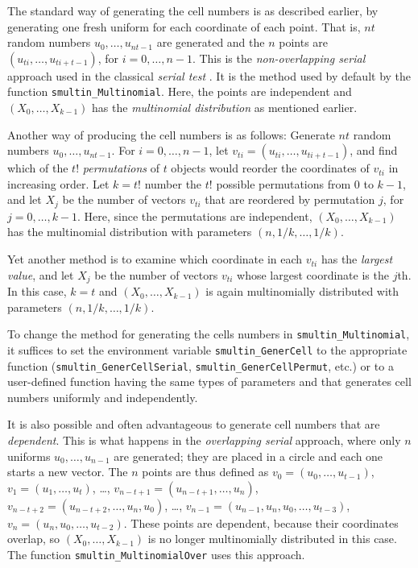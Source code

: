 The 
 standard way of generating the cell numbers is as described earlier,
by generating one fresh uniform for each coordinate of each point.
That is, $nt$ random numbers $u_0,\dots,u_{nt-1}$ are generated and
the $n$ points are $(u_{ti},\dots,u_{ti+t-1})$, for $i=0,\dots,n-1$.
This is the {\em non-overlapping serial\/} approach used in the
classical {\em serial test\/} \cite{rKNU98a}.
It is the method used by default by the function 
{\tt smultin\_Multinomial}.
Here, the points are independent and $(X_0,\dots,X_{k-1})$ has the 
{\em multinomial distribution\/} as mentioned earlier.

Another way of producing the cell numbers is as follows:
Generate $nt$ random numbers $u_0,\dots,u_{nt-1}$.
For $i=0,\dots,n-1$, let $v_{ti} = (u_{ti},\dots,u_{ti+t-1})$, 
and find which of the $t!$ {\em permutations\/} of $t$ objects would
reorder the coordinates of $v_{ti}$ in increasing order.
Let $k = t!$ number the $t!$ possible permutations from 0 to $k-1$, 
and let $X_j$ be the number of vectors $v_{ti}$ that are reordered 
by permutation $j$, for $j = 0,\dots,k-1$.
Here, since the permutations are independent, $(X_0,\dots,X_{k-1})$ 
has the multinomial distribution with parameters $(n,1/k,\dots,1/k)$.

Yet another method is to examine which coordinate in each $v_{ti}$ has
the {\em largest value\/}, and let $X_j$ be the number of vectors $v_{ti}$
whose largest coordinate is the $j$th.
In this case, $k=t$ and  $(X_0,\dots,X_{k-1})$ is again 
multinomially distributed with parameters $(n,1/k,\dots,1/k)$.
  
To change the method for generating the cells numbers 
in {\tt smultin\_Multinomial},
it suffices to set the environment variable {\tt smultin\_GenerCell}
to the appropriate function ({\tt smultin\_GenerCellSerial}, 
{\tt smultin\_GenerCellPermut}, etc.) or to
a user-defined function having the same types of parameters and 
that generates cell numbers uniformly and independently.

It is also possible and often advantageous to generate cell numbers
that are {\em dependent}.  This is what happens in the
{\em overlapping serial\/} approach, where only $n$ uniforms 
$u_0,\dots,u_{n-1}$ are generated; they are placed in a circle
and each one starts a new vector.  The $n$ points are thus
defined as $v_0 = (u_0,\dots,u_{t-1})$, $v_1=(u_1,\dots,u_t)$, \dots,
 $v_{n-t+1} = (u_{n-t+1},\dots,u_n)$, 
 $v_{n-t+2} = (u_{n-t+2},\dots,u_n,u_0)$, \dots, 
 $v_{n-1} = (u_{n-1},u_n,u_0,\dots,u_{t-3})$, 
 $v_n = (u_n,u_0,\dots,u_{t-2})$. 
These points are dependent, because their coordinates overlap,
so $(X_0,\dots,X_{k-1})$ is no longer multinomially distributed in
this case. The function {\tt smultin\_MultinomialOver} uses this approach.

